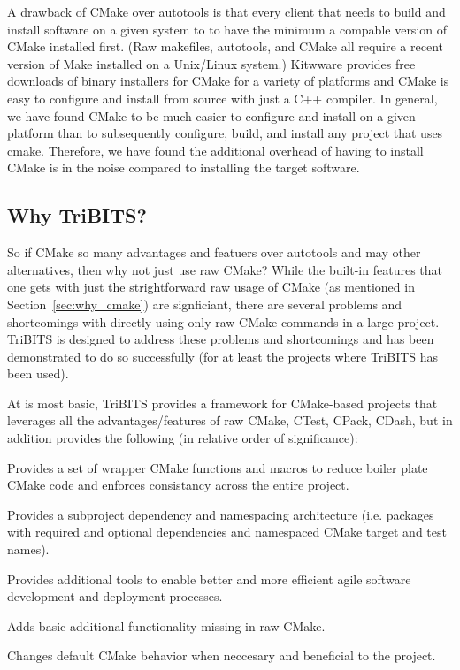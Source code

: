 \documentclass[10pt]{article}
\begin{document}
A drawback of CMake over autotools is that every client that needs to build and install software on a given system to to have the minimum a compable version of CMake installed first.  (Raw makefiles, autotools, and CMake all require a recent version of Make installed on a Unix/Linux system.)  Kitwware provides free downloads of binary installers for CMake for a variety of platforms and CMake is easy to configure and install from source with just a C++ compiler.  In general, we have found CMake to be much easier to configure and install on a given platform than to subsequently configure, build, and install any project that uses cmake.  Therefore, we have found the additional overhead of having to install CMake is in the noise compared to installing the target software.

%
\subsection{Why TriBITS?}
%

So if CMake so many advantages and featuers over autotools and may other alternatives, then why not just use raw CMake?  While the built-in features that one gets with just the strightforward raw usage of CMake (as mentioned in Section~\ref{sec:why_cmake}) are signficiant, there are several problems and shortcomings with directly using only raw CMake commands in a large project.  TriBITS is designed to address these problems and shortcomings and has been demonstrated to do so successfully (for at least the projects where TriBITS has been used).

At is most basic, TriBITS provides a framework for CMake-based projects that leverages all the advantages/features of raw CMake, CTest, CPack, CDash, but in addition provides the following (in relative order of significance):

\begin{compactitem}
\item Provides a set of wrapper CMake functions and macros to reduce boiler plate CMake code and enforces consistancy across the entire project.
\item Provides a subproject dependency and namespacing architecture (i.e. packages with required and optional dependencies and namespaced CMake target and test names).
\item Provides additional tools to enable better and more efficient agile software development and deployment processes.
\item Adds basic additional functionality missing in raw CMake.
\item Changes default CMake behavior when neccesary and beneficial to the project.
\end{compactitem}
\end{document}
